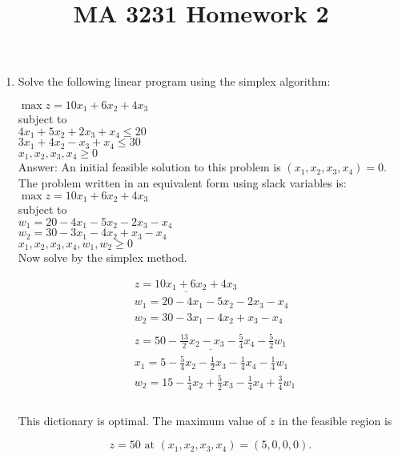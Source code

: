 \documentclass{article}
\title{MA 3231 Homework 2}
\date{}
\author{}
\begin{document}
\maketitle

\begin{enumerate}

\item

Solve the following linear program using the simplex algorithm:

$\max z = 10x_1 + 6x_2 + 4x_3$\\
subject to \\
$4x_1 + 5x_2 + 2x_3 + x_4 \leq 20$\\
$3x_1 + 4x_2 - x_3 + x_4 \leq 30$ \\
$x_1, x_2, x_3, x_4 \geq 0$\\

Answer: An initial feasible solution to this problem is $(x_1,x_2,x_3,x_4) = 0$. The problem written in an equivalent form using slack variables is:\\

$\max z = 10x_1 + 6x_2 + 4x_3$\\
subject to \\
$w_1 = 20 - 4x_1 - 5x_2 - 2x_3 - x_4$\\
$w_2 = 30 - 3x_1 - 4x_2 + x_3 - x_4$ \\
$x_1, x_2, x_3, x_4, w_1, w_2 \geq 0$\\

Now solve by the simplex method.

\begin{align*}
&\underline{z = 10x_1 + 6x_2 + 4x_3} \\
&w_1 = 20 - 4x_1 - 5x_2 - 2x_3 - x_4 \\
&w_2 = 30 - 3x_1 - 4x_2 + x_3 - x_4\\
&\\
&\underline{z = 50  - \frac{13}{2}x_2 - x_3 - \frac{5}{4}x_4 - \frac{5}{2}w_1} \\
&x_1 = 5 - \frac{5}{4}x_2 - \frac{1}{2}x_3 -\frac{1}{4} x_4 - \frac{1}{4}w_1 \\
&w_2 = 15 -\frac{1}{4}x_2 + \frac{5}{2}x_3- \frac{1}{4}x_4 + \frac{3}{4}w_1\\
&\\
\end{align*}

This dictionary is optimal. The maximum value of $z$ in the feasible region is 

$$
\boxed{ z = 50 \text{ at }
(x_1, x_2, x_3, x_4) =  (5,0,0,0).}
$$


\end{enumerate}
\end{document}
